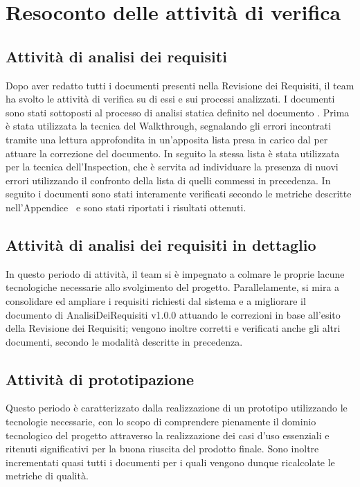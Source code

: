 \newpage
\section{Resoconto delle attività di verifica}
\subsection{Attività di analisi dei requisiti}

Dopo aver redatto tutti i documenti presenti nella Revisione dei Requisiti, il team ha svolto le attività di verifica su di essi e sui processi analizzati. I documenti sono stati sottoposti al processo di analisi statica definito nel documento \NdP{}.
Prima è stata utilizzata la tecnica del Walkthrough, segnalando gli errori incontrati tramite una lettura approfondita in un'apposita lista presa in carico dal \ver{} per attuare la correzione del documento. In seguito la stessa lista è stata utilizzata per la tecnica dell'Inspection, che è servita ad individuare la presenza di nuovi errori utilizzando il confronto della lista di quelli commessi in precedenza.
In seguito i documenti sono stati interamente verificati secondo le metriche descritte nell'Appendice~ e sono stati riportati i risultati ottenuti.

\subsection{Attività di analisi dei requisiti in dettaglio}

In questo periodo di attività, il team si è impegnato a colmare le proprie lacune tecnologiche necessarie allo svolgimento del progetto. Parallelamente, si mira a consolidare ed ampliare i requisiti richiesti dal sistema e a migliorare il documento di AnalisiDeiRequisiti v1.0.0 attuando le correzioni in base all’esito della Revisione dei Requisiti; vengono inoltre corretti e verificati anche gli altri documenti, secondo le modalità descritte in precedenza. 


\subsection{Attività di prototipazione}
Questo periodo è caratterizzato dalla realizzazione di un prototipo utilizzando le tecnologie necessarie, con lo scopo di comprendere pienamente il dominio tecnologico del progetto attraverso la realizzazione dei casi d’uso essenziali e ritenuti
significativi per la buona riuscita del prodotto finale. Sono inoltre incrementati quasi tutti i documenti per i quali vengono dunque ricalcolate le metriche di qualità.


